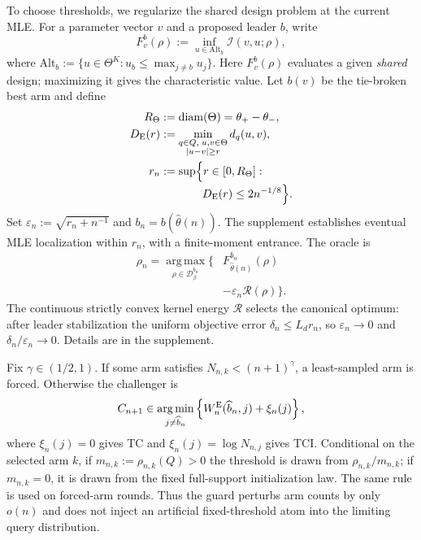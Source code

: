 \documentclass[twoside]{article}
\theoremstyle{definition}
\newcommand{\1}{\mathbf 1}
\newcommand{\argmax}{\operatorname*{arg\,max}}
\newcommand{\argmin}{\operatorname*{arg\,min}}
\begin{document}
To choose thresholds, we regularize the shared design problem at the current MLE.
For a parameter vector $v$ and a proposed leader $b$, write
\[
F_v^b(\rho):=\inf_{u\in\mathrm{Alt}_b}\mathcal I(v,u;\rho),
\]
where $\mathrm{Alt}_b:=\{u\in\Theta^K:u_b\le\max_{j\ne b}u_j\}$.
Here $F_v^b(\rho)$ evaluates a given \emph{shared} design;
maximizing it gives the characteristic value. Let $b(v)$ be the
tie-broken best arm and define
\begin{equation}
\begin{aligned}
R_\Theta&:=\operatorname{diam}(\Theta)=\theta_+-\theta_-,\\
D_{\rm E}(r)&:=\min_{\substack{q\in Q,\;u,v\in\Theta\\|u-v|\ge r}}d_q(u,v),\\
r_n&:=\sup\Bigl\{r\in[0,R_\Theta]:\\[-2pt]
&\hspace{1.3cm}D_{\rm E}(r)\le2n^{-1/8}\Bigr\}.
\end{aligned}
\label{eq:rn-main}
\end{equation}
Set $\varepsilon_n:=\sqrt{r_n+n^{-1}}$ and
$b_n=b(\widehat\theta(n))$. The supplement establishes eventual MLE
localization within $r_n$, with a finite-moment entrance. The oracle is
\begin{equation}
\begin{aligned}
\rho_n=\argmax_{\rho\in\mathcal D_\beta^{b_n}}
\bigl\{&F_{\widehat\theta(n)}^{b_n}(\rho)\\[-2pt]
&-\varepsilon_n\mathcal R(\rho)\bigr\}.
\end{aligned}
\label{eq:regoracle-main}
\end{equation}
The continuous strictly convex kernel energy $\mathcal R$ selects the
canonical optimum: after leader stabilization the uniform objective
error $\delta_n\le L_d r_n$, so $\varepsilon_n\to0$ and
$\delta_n/\varepsilon_n\to0$. Details are in the supplement.

Fix $\gamma\in(1/2,1)$.  If some arm satisfies $N_{n,k}<(n+1)^\gamma$, a least-sampled arm is forced.  Otherwise the challenger is
\begin{equation}
C_{n+1}\in\argmin_{j\ne \widehat b_n}
\left\{W_n^{\rm E}(\widehat b_n,j)+\xi_n(j)\right\},
\label{eq:challE}
\end{equation}
where $\xi_n(j)=0$ gives TC and $\xi_n(j)=\log N_{n,j}$ gives TCI.  Conditional on the selected arm $k$, if $m_{n,k}:=\rho_{n,k}(Q)>0$ the threshold is drawn from $\rho_{n,k}/m_{n,k}$; if $m_{n,k}=0$, it is drawn from the fixed full-support initialization law.  The same rule is used on forced-arm rounds.  Thus the guard perturbs arm counts by only $o(n)$ and does not inject an artificial fixed-threshold atom into the limiting query distribution.
\end{document}
